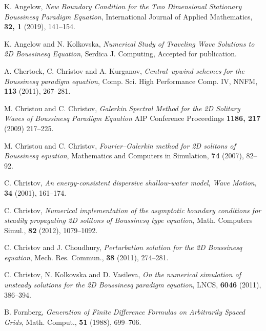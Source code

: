 \documentclass[11pt,a4paper,twoside]{article}
\begin{document}
\begin{thebibliography}{99}

K. Angelow, 
\emph{New Boundary Condition for the Two Dimensional Stationary Boussinesq Paradigm Equation},
International Journal of Applied Mathematics, \textbf{32, 1} (2019), 141--154.

K. Angelow and N. Kolkovska, 
\emph{Numerical Study of Traveling Wave Solutions to 2D Boussinesq Equation},
Serdica J. Computing,  Accepted for publication.

A. Chertock, C. Christov and A. Kurganov, 
\emph{Central--upwind schemes for the  Boussinesq paradigm equation},
Comp. Sci. High Performance Comp. IV, NNFM, \textbf{113} (2011), 267--281.

M. Christou and C. Christov, 
\emph{Galerkin Spectral Method for the 2D Solitary Waves of Boussinesq Paradigm Equation}
AIP Conference Proceedings \textbf{1186, 217} (2009) 217--225.

M. Christou and C. Christov, 
\emph{Fourier–Galerkin method for 2D solitons of Boussinesq equation}, 
Mathematics and Computers in Simulation, \textbf{74} (2007), 82--92.

C. Christov, 
\emph{An energy-consistent dispersive shallow-water model}, 
{\it Wave Motion}, \textbf{34} (2001), 161--174.

C. Christov, 
\emph{Numerical implementation of the asymptotic boundary conditions
for steadily propagating 2D solitons of Boussinesq type equation},       
Math. Computers  Simul., \textbf{82} (2012),  1079--1092.

C. Christov and J. Choudhury, 
\emph{Perturbation solution  for the 2D Boussinesq equation},       
Mech. Res. Commun., \textbf{38} (2011),  274--281.

C. Christov, N. Kolkovska and D. Vasileva, 
\emph{On the numerical simulation of unsteady solutions for the 2D Boussinesq paradigm equation},
LNCS, \textbf{6046} (2011), 386--394.

B. Fornberg, 
\emph{Generation of Finite Difference Formulas on Arbitrarily Spaced Grids}, 
Math. Comput., \textbf{51} (1988),  699--706.


\end{thebibliography}
\end{document}

